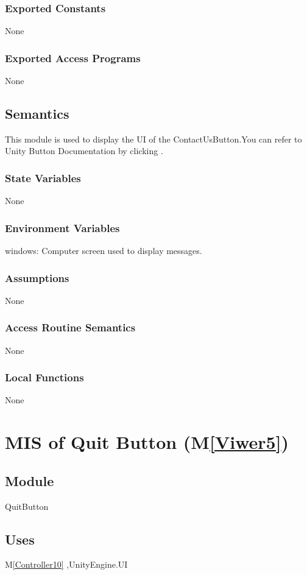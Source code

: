 \documentclass[12pt, titlepage]{article}
\newcommand{\mref}[1]{M\ref{#1}}
\begin{document}
\subsubsection{Exported Constants}
None
\subsubsection{Exported Access Programs}
None

\subsection{Semantics}
This module is used to display the UI of the ContactUsButton.You can refer to Unity Button Documentation by clicking \bref.
\subsubsection{State Variables}
None
\subsubsection{Environment Variables}
windows: Computer screen used to display messages.
\subsubsection{Assumptions}
None
\subsubsection{Access Routine Semantics}
None
\subsubsection{Local Functions}
None

\newpage

\section{MIS of Quit Button (\mref{Viwer5})}

\subsection{Module}
QuitButton

\subsection{Uses}
\mref{Controller10} ,UnityEngine.UI 
\end{document}
